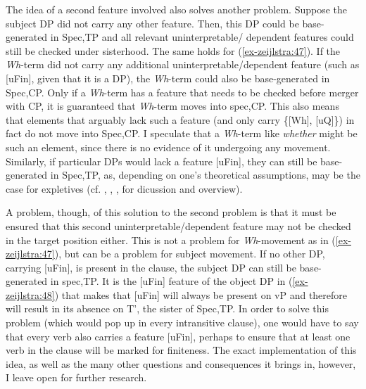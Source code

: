 \documentclass[output=paper
,modfonts
,nonflat]{langsci/langscibook}
\begin{document}
\begin{figure}[!h]
	\begin{exe}
	\end{exe} \vspace{-0.7cm}
\end{figure}
 \noindent
The idea of a second feature involved also solves another problem. Suppose the subject DP did not carry any other feature. Then, this DP could be base-generated in Spec,TP and all relevant uninterpretable/ dependent features could still be checked under sisterhood. The same holds for (\ref{ex-zeijlstra:47}). If the \textit{Wh}-term did not carry any additional uninterpretable/dependent feature (such as [uFin], given that it is a DP), the \textit{Wh}-term could also be base-generated in Spec,CP. Only if a \textit{Wh}-term has a feature that needs to be checked before merger with CP, it is guaranteed that \textit{Wh}-term moves into spec,CP. This also means that elements that arguably lack such a feature (and only carry \{[Wh], [uQ]\}) in fact do not move into Spec,CP. I speculate that a \textit{Wh}{}-term like \textit{whether} might be such an element, since there is no evidence of it undergoing any movement. Similarly, if particular DPs would lack a feature [uFin], they can still be base-generated in Spec,TP, as, depending on one’s theoretical assumptions, may be the case for expletives (cf. \citealt{Chomsky2000}, \citealt{Boskovic2002}, \citealt{Deal2009}, \citealt{Wu2018} for dicussion and overview). 

A problem, though, of this solution to the second problem is that it must be ensured that this second uninterpretable/dependent feature may not be checked in the target position either. This is not a problem for \textit{Wh}-movement as in (\ref{ex-zeijlstra:47}), but can be a problem for subject movement. If no other DP, carrying [uFin], is present in the clause, the subject DP can still be base-generated in spec,TP. It is the [uFin] feature of the object DP in (\ref{ex-zeijlstra:48}) that makes that [uFin] will always be present on vP and therefore will result in its absence on T’, the sister of Spec,TP. In order to solve this problem (which would pop up in every intransitive clause), one would have to say that every verb also carries a feature [uFin], perhaps to ensure that at least one verb in the clause will be marked for finiteness. The exact implementation of this idea, as well as the many other questions and consequences it brings in, however, I leave open for further research.
\end{document}
